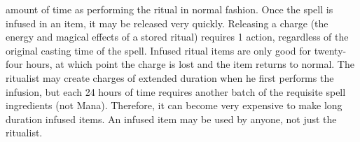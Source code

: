 \documentclass[twoside]{book}
\begin{document}
               amount of time as performing the ritual in normal fashion.
               Once the spell is infused in an item, it may be released
               very quickly. Releasing a charge (the energy and magical
               effects of a stored ritual) requires 1 action, regardless
               of the original casting time of the spell. Infused ritual
               items are only good for twenty-four hours, at which point
               the charge is lost and the item returns to normal. The
               ritualist may create charges of extended duration when he
               first performs the infusion, but each 24 hours of time
               requires another batch of the requisite spell ingredients
               (not Mana). Therefore, it can become very expensive to
               make long duration infused items. An infused item may be
               used by anyone, not just the ritualist. 
    
\end{document}
